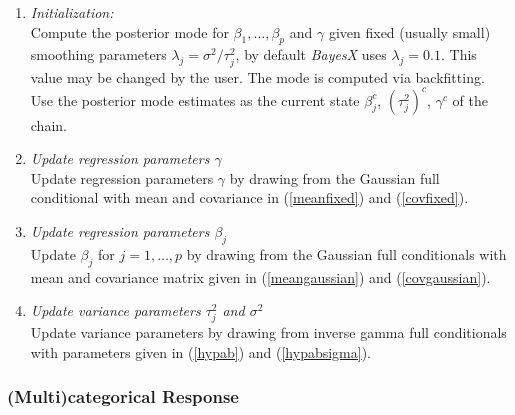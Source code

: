\documentclass[11pt,a4paper,twoside]{bayesxarticle}
\begin{document}
\begin{enumerate}
\item {\em Initialization:} \\
Compute the posterior mode for $\beta_1,\dots,\beta_p$ and
$\gamma$ given fixed (usually small) smoothing parameters
$\lambda_j = \sigma^2/\tau^2_j$, by default {\em BayesX} uses
$\lambda_j = 0.1$. This value may be changed by the user. The mode
is computed via backfitting. Use the posterior mode estimates as
the current state $\beta_j^c$, $(\tau_j^2)^c$, $\gamma^c$ of the
chain.
\item {\em Update regression parameters $\gamma$} \\
Update regression parameters $\gamma$ by drawing from the Gaussian
full conditional with mean and covariance in (\ref{meanfixed}) and
(\ref{covfixed}).
\item {\em Update regression parameters $\beta_j$} \\
Update $\beta_j$ for $j=1,\dots,p$ by drawing from the Gaussian
full conditionals with mean and covariance matrix given in
(\ref{meangaussian}) and (\ref{covgaussian}).
\item {\em Update variance parameters $\tau^2_j$ and $\sigma^2$} \\
Update variance parameters by drawing from inverse gamma full
conditionals with parameters given in (\ref{hypab}) and
(\ref{hypabsigma}).
\end{enumerate}

\subsubsection{(Multi)categorical Response}
\label{mulitcategoricalresp}
\end{document}
